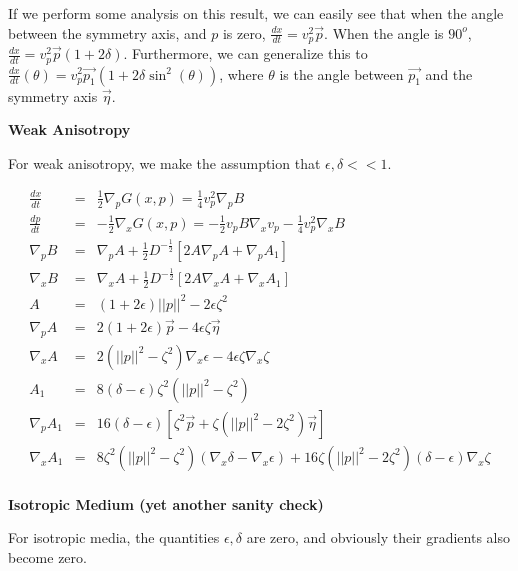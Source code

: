 \documentclass[12pt]{article}
\begin{document}
If we perform some analysis on this result, we can easily see that when the angle between the symmetry axis, and $p$ is zero, $\frac{dx}{dt}=v_p^2\vec{p}$. When the angle is $90^o$, $\frac{dx}{dt}=v_p^2\vec{p}(1+2\delta)$. Furthermore, we can generalize this to $\frac{dx}{dt}(\theta) = v_p^2\vec{p_1}(1+2\delta\sin^2(\theta))$, where $\theta$ is the angle between $\vec{p_1}$ and the symmetry axis $\vec{\eta}$. 

\textbf{Weak Anisotropy}

For weak anisotropy, we make the assumption that $\epsilon,\delta<<1$. 

\begin{eqnarray}
\frac{dx}{dt}   &=&  \frac{1}{2}\nabla_p G(x,p) =  \frac{1}{4}v_p^2\nabla_pB\\
\frac{dp}{dt}   &=& -\frac{1}{2}\nabla_x G(x,p) = -\frac{1}{2}v_pB\nabla_xv_p-\frac{1}{4}v_p^2\nabla_xB\\
\nabla_p B      &=&  \nabla_p A+\frac{1}{2}D^{-\frac{1}{2}}\left[2A\nabla_p A + \nabla_p A_1\right]\\
\nabla_x B      &=&  \nabla_x A+\frac{1}{2}D^{-\frac{1}{2}}\left[2A\nabla_x A + \nabla_x A_1\right]\\
A               &=&  (1+2\epsilon)||p||^2-2\epsilon\zeta^2 \\
\nabla_p A      &=&  2(1+2\epsilon)\vec{p}-4\epsilon\zeta\vec{\eta}\\
\nabla_x A      &=&  2(||p||^2-\zeta^2)\nabla_x \epsilon - 4\epsilon\zeta\nabla_x \zeta\\
A_1             &=&  8(\delta-\epsilon)\zeta^2(||p||^2-\zeta^2) \\
\nabla_p A_1    &=&  16(\delta-\epsilon)\left[\zeta^2\vec{p}+\zeta(||p||^2-2\zeta^2)\vec{\eta}\right]\\
\nabla_x A_1    &=&  8\zeta^2(||p||^2-\zeta^2)(\nabla_x \delta - \nabla_x \epsilon) + 16\zeta(||p||^2-2\zeta^2)(\delta-\epsilon)\nabla_x \zeta \nonumber\\
\end{eqnarray}

\textbf{Isotropic Medium (yet another sanity check)}

For isotropic media, the quantities $\epsilon,\delta$ are zero, and obviously their gradients also become zero.
\end{document}
